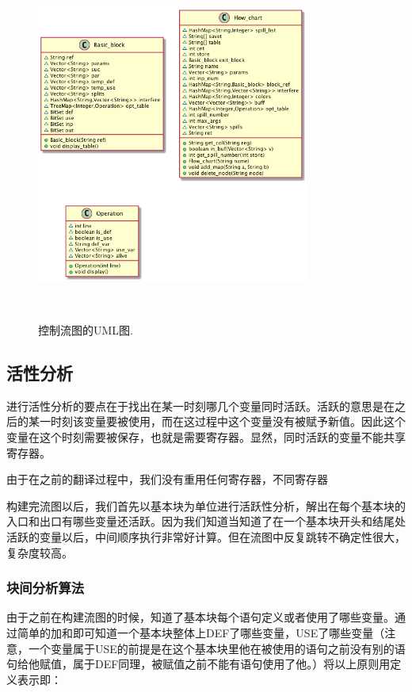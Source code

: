 \documentclass[10pt,a4paper]{article}
\begin{document}
\begin{figure}[t!]
\centering
  \includegraphics[width=0.8\textwidth]{uml3.png}
  \caption{控制流图的UML图.}~\label{fig:umlc}
\end{figure}

\subsection{活性分析}

进行活性分析的要点在于找出在某一时刻哪几个变量同时活跃。活跃的意思是在之后的某一时刻该变量要被使用，而在这过程中这个变量没有被赋予新值。因此这个变量在这个时刻需要被保存，也就是需要寄存器。显然，同时活跃的变量不能共享寄存器。

由于在之前的翻译过程中，我们没有重用任何寄存器，不同寄存器

构建完流图以后，我们首先以基本块为单位进行活跃性分析，解出在每个基本块的入口和出口有哪些变量还活跃。因为我们知道当知道了在一个基本块开头和结尾处活跃的变量以后，中间顺序执行非常好计算。但在流图中反复跳转不确定性很大，复杂度较高。

\subsubsection{块间分析算法}

由于之前在构建流图的时候，知道了基本块每个语句定义或者使用了哪些变量。通过简单的加和即可知道一个基本块整体上DEF了哪些变量，USE了哪些变量（注意，一个变量属于USE的前提是在这个基本块里他在被使用的语句之前没有别的语句给他赋值，属于DEF同理，被赋值之前不能有语句使用了他。）将以上原则用定义表示即：
\end{document}

